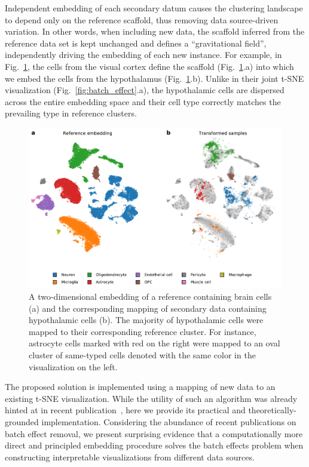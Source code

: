 \documentclass[runningheads]{llncs}
\begin{document}
Independent embedding of each secondary datum causes the clustering landscape
to depend only on the reference scaffold, thus removing data source-driven
variation. In other words, when including new data, the scaffold inferred from
the reference data set is kept unchanged and defines a ``gravitational field'',
independently driving the embedding of each new instance. For example, in
Fig.~\ref{fig:transform_brain}, the cells from the visual cortex define the
scaffold (Fig.~\ref{fig:transform_brain}.a) into which we embed the cells from
the hypothalamus (Fig.~\ref{fig:transform_brain}.b). Unlike in their joint
t\nobreakdash -SNE visualization (Fig.~\ref{fig:batch_effect}.a), the
hypothalamic cells are dispersed across the entire embedding space and their
cell type correctly matches the prevailing type in reference clusters.

\begin{figure}[htb]
  \includegraphics[width=\textwidth]{figures/transform_brain.pdf}
  \caption{A two-dimensional embedding of a reference containing brain cells
  (a) and the corresponding mapping of secondary data containing hypothalamic
  cells (b).  The majority of hypothalamic cells were mapped to their
  corresponding reference cluster. For instance, astrocyte cells marked with
  red on the right were mapped to an oval cluster of same-typed cells denoted
  with the same color in the visualization on the left.}
  \label{fig:transform_brain}
\end{figure}

The proposed solution is implemented using a mapping of new data to an existing
t-SNE visualization. While the utility of such an algorithm was already hinted
at in recent publication~\cite{art_of_using_tsne}, here we provide its
practical and theoretically-grounded implementation. Considering the abundance
of recent publications on batch effect removal, we present surprising evidence
that a computationally more direct and principled embedding procedure solves
the batch effects problem when constructing interpretable visualizations from
different data sources.
\end{document}
